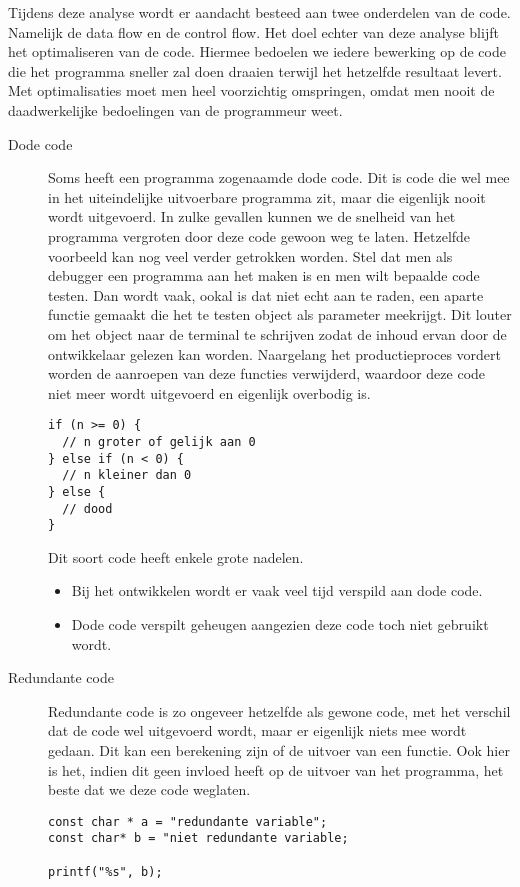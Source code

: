 \documentclass[12pt,a4paper]{article}
\begin{document}
Tijdens deze analyse wordt er aandacht besteed aan twee onderdelen van de code. Namelijk de data flow en de control flow. Het doel echter van deze analyse blijft het optimaliseren van de code. Hiermee bedoelen we iedere bewerking op de code die het programma sneller zal doen draaien terwijl het hetzelfde resultaat levert. Met optimalisaties moet men heel voorzichtig omspringen, omdat men nooit de daadwerkelijke bedoelingen van de programmeur weet.


\begin{description}
\item[Dode code] Soms heeft een programma zogenaamde dode code. Dit is code die wel mee in het uiteindelijke uitvoerbare programma zit, maar die eigenlijk nooit wordt uitgevoerd. In zulke gevallen kunnen we de snelheid van het programma vergroten door deze code gewoon weg te laten. Hetzelfde voorbeeld kan nog veel verder getrokken worden. Stel dat men als debugger een programma aan het maken is en men wilt bepaalde code testen. Dan wordt vaak, ookal is dat niet echt aan te raden, een aparte functie gemaakt die het te testen object als parameter meekrijgt. Dit louter om het object naar de terminal te schrijven zodat de inhoud ervan door de ontwikkelaar gelezen kan worden. Naargelang het productieproces vordert worden de aanroepen van deze functies verwijderd, waardoor deze code niet meer wordt uitgevoerd en eigenlijk overbodig is.

\begin{verbatim}
if (n >= 0) {
  // n groter of gelijk aan 0
} else if (n < 0) {
  // n kleiner dan 0
} else {
  // dood
}
\end{verbatim}

Dit soort code heeft enkele grote nadelen.
\begin{itemize}
\item Bij het ontwikkelen wordt er vaak veel tijd verspild aan dode code.
\item Dode code verspilt geheugen aangezien deze code toch niet gebruikt wordt.
\end{itemize}

\item[Redundante code] Redundante code is zo ongeveer hetzelfde als gewone code, met het verschil dat de code wel uitgevoerd wordt, maar er eigenlijk niets mee wordt gedaan. Dit kan een berekening zijn of de uitvoer van een functie. Ook hier is het, indien dit geen invloed heeft op de uitvoer van het programma, het beste dat we deze code weglaten.

\begin{verbatim}
const char * a = "redundante variable";
const char* b = "niet redundante variable;

printf("%s", b);
\end{verbatim}

\end{description}
\end{document}
